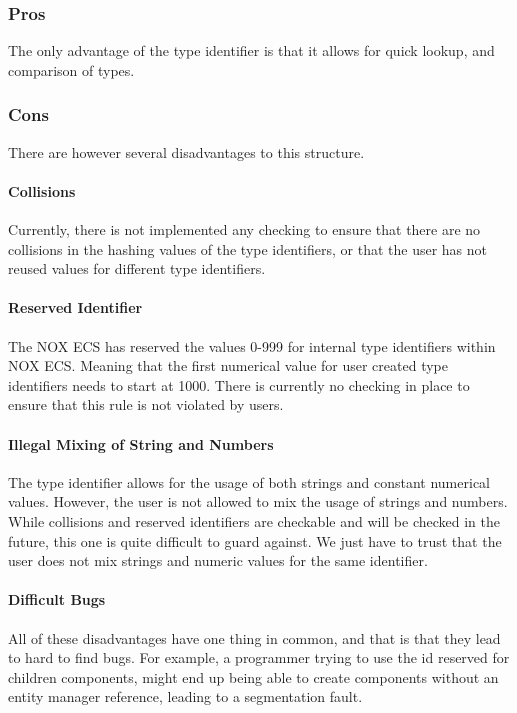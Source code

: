 \subsubsection{Pros}
The only advantage of the type identifier is that it allows for quick lookup, and comparison of types.

\subsubsection{Cons}
There are however several disadvantages to this structure.

\paragraph{Collisions}
Currently, there is not implemented any checking to ensure that there are no collisions in the hashing values of the type identifiers, or that the user has not reused values for different type identifiers.

\paragraph{Reserved Identifier}
The NOX ECS has reserved the values 0-999 for internal type identifiers within NOX ECS. 
Meaning that the first numerical value for user created type identifiers needs to start at 1000. There is currently no checking in place to ensure that this rule is not violated by users.

\paragraph{Illegal Mixing of String and Numbers}
The type identifier allows for the usage of both strings and constant numerical values.
However, the user is not allowed to mix the usage of strings and numbers.
While collisions and reserved identifiers are checkable and will be checked in the future,
this one is quite difficult to guard against. 
We just have to trust that the user does not
mix strings and numeric values for the same identifier.

\paragraph{Difficult Bugs}
All of these disadvantages have one thing in common, and that is that they lead to hard to find bugs. 
For example, a programmer trying to use the id reserved for children components, might end up being able to create components without an entity manager reference, leading to a segmentation fault.